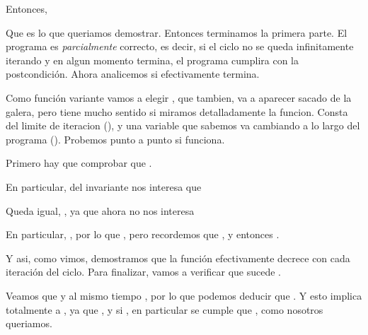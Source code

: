 \documentclass{article}
\begin{document}
Entonces, 

Que es lo que queriamos demostrar. Entonces terminamos la primera parte. El programa es \textit{parcialmente} correcto, es decir, si el ciclo no se queda infinitamente iterando y en algun momento termina, el programa cumplira con la postcondición. Ahora analicemos si efectivamente termina.

Como función variante vamos a elegir , que tambien, va a aparecer sacado de la galera, pero tiene mucho sentido si miramos detalladamente la funcion. Consta del limite de iteracion (), y una variable que sabemos va cambiando a lo largo del programa (). Probemos punto a punto si funciona.

Primero hay que comprobar que .

En particular, del invariante nos interesa que 


Queda igual, , ya que ahora  no nos interesa



En particular, , por lo que , pero recordemos que , y entonces .

Y asi, como vimos, demostramos que la función efectivamente decrece con cada iteración del ciclo. Para finalizar, vamos a verificar que sucede .



Veamos que  y al mismo tiempo , por lo que podemos deducir que . Y esto implica totalmente a , ya que , y si , en particular se cumple que , como nosotros queriamos.
\end{document}
